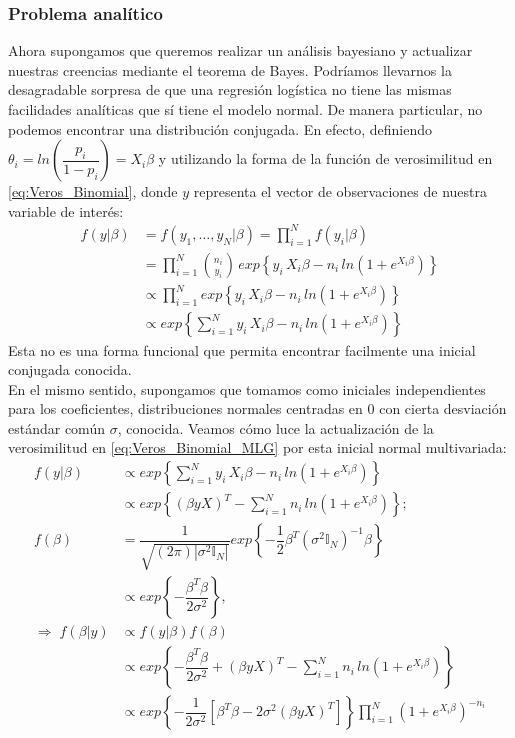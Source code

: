 \subsubsection{Problema analítico}

Ahora supongamos que queremos realizar un análisis bayesiano y actualizar nuestras creencias mediante el teorema de Bayes. Podríamos llevarnos la desagradable sorpresa de que una regresión logística no tiene las mismas facilidades analíticas que sí tiene el modelo normal. De manera particular, no podemos encontrar una distribución conjugada. En efecto, definiendo $\theta_i = ln\left(\dfrac{p_i}{1-p_i}\right)=X_i\beta$ y utilizando la forma de la función de verosimilitud en \eqref{eq:Veros_Binomial}, donde $y$ representa el vector de observaciones de nuestra variable de interés: 
\begin{align} \label{eq:Veros_Binomial_MLG} 
f(y|\beta) &= f(y_1,\dots,y_N|\beta)= \prod_{i=1}^N f(y_i|\beta) \nonumber\\
&= \prod_{i=1}^N {n_i\choose y_i}\,exp\left\lbrace y_i\,X_i\beta-n_i\,ln\left(1+e^{X_i\beta}\right)\right\rbrace \nonumber\\
&\propto \prod_{i=1}^N exp\left\lbrace y_i\,X_i\beta-n_i\,ln\left(1+e^{X_i\beta}\right)\right\rbrace \nonumber\\
&\propto exp\left\lbrace \sum\limits_{i=1}^Ny_i\,X_i\beta-n_i\,ln\left(1+e^{X_i\beta}\right)\right\rbrace 
\end{align}
Esta no es una forma funcional que permita encontrar facilmente una inicial conjugada conocida.\\

En el mismo sentido, supongamos que tomamos como iniciales independientes para los coeficientes, distribuciones normales centradas en $0$ con cierta desviación estándar común $\sigma$, conocida. Veamos cómo luce la actualización de la verosimilitud en \eqref{eq:Veros_Binomial_MLG} por esta inicial normal multivariada: 
\begin{align*}
f(y|\beta) &\propto exp\left\lbrace \sum\limits_{i=1}^N y_i\,X_i\beta-n_i\,ln\left(1+e^{X_i\beta}\right)\right\rbrace \\
&\propto exp\left\lbrace (\beta yX)^T-\sum\limits_{i=1}^Nn_i\,ln\left(1+e^{X_i\beta}\right)\right\rbrace; \\
f(\beta) &= \dfrac{1}{\sqrt{(2\pi)|\sigma^2 \mathbb{I}_N|}}exp\left\lbrace -\dfrac{1}{2}\beta^T(\sigma^2\mathbb{I}_N)^{-1}\beta\right\rbrace \\
&\propto exp\left\lbrace -\dfrac{\beta^T\beta}{2\sigma^2}\right\rbrace, \\
\Rightarrow \; f(\beta|y)&\propto f(y|\beta)f(\beta) \\
&\propto exp\left\lbrace -\dfrac{\beta^T\beta}{2\sigma^2} + (\beta yX)^T-\sum\limits_{i=1}^Nn_i\,ln\left(1+e^{X_i\beta}\right)\right\rbrace \\
&\propto exp\left\lbrace -\dfrac{1}{2\sigma^2}\left[\beta^T\beta - 2\sigma^2(\beta yX)^T\right]\right\rbrace\prod_{i=1}^N \left(1+e^{X_i\beta}\right)^{-n_i}
\end{align*}

